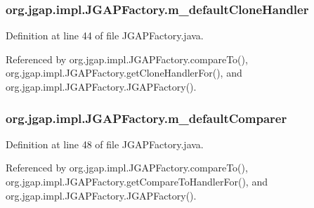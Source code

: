 \hypertarget{classorg_1_1jgap_1_1impl_1_1_j_g_a_p_factory_a4e813188a3eb70a310cf1516e99f9d68}{
\subsubsection[{m\-\_\-default\-Clone\-Handler}]{ org.\-jgap.\-impl.\-J\-G\-A\-P\-Factory.\-m\-\_\-default\-Clone\-Handler\hspace{0.3cm}{\ttfamily [private]}}}\label{classorg_1_1jgap_1_1impl_1_1_j_g_a_p_factory_a4e813188a3eb70a310cf1516e99f9d68}


Definition at line 44 of file J\-G\-A\-P\-Factory.\-java.



Referenced by org.\-jgap.\-impl.\-J\-G\-A\-P\-Factory.\-compare\-To(), org.\-jgap.\-impl.\-J\-G\-A\-P\-Factory.\-get\-Clone\-Handler\-For(), and org.\-jgap.\-impl.\-J\-G\-A\-P\-Factory.\-J\-G\-A\-P\-Factory().

\hypertarget{classorg_1_1jgap_1_1impl_1_1_j_g_a_p_factory_aceff8aab7df3263c82802832355840de}{
\subsubsection[{m\-\_\-default\-Comparer}]{ org.\-jgap.\-impl.\-J\-G\-A\-P\-Factory.\-m\-\_\-default\-Comparer\hspace{0.3cm}{\ttfamily [private]}}}\label{classorg_1_1jgap_1_1impl_1_1_j_g_a_p_factory_aceff8aab7df3263c82802832355840de}


Definition at line 48 of file J\-G\-A\-P\-Factory.\-java.



Referenced by org.\-jgap.\-impl.\-J\-G\-A\-P\-Factory.\-compare\-To(), org.\-jgap.\-impl.\-J\-G\-A\-P\-Factory.\-get\-Compare\-To\-Handler\-For(), and org.\-jgap.\-impl.\-J\-G\-A\-P\-Factory.\-J\-G\-A\-P\-Factory().

